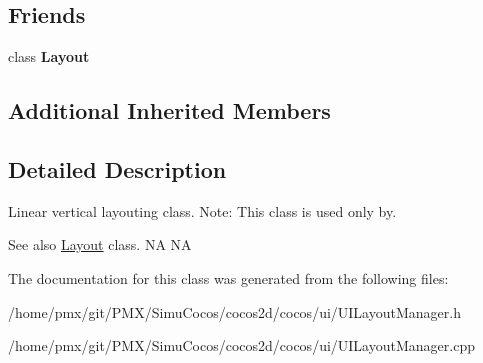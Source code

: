 \subsection*{Friends}
\begin{DoxyCompactItemize}
\item 
\mbox{\label{classui_1_1LinearVerticalLayoutManager_a1b7da28ed84c0763e8f92cde2df4799b}} 
class {\bfseries Layout}
\end{DoxyCompactItemize}
\subsection*{Additional Inherited Members}


\subsection{Detailed Description}
Linear vertical layouting class. Note\+: This class is used only by. 

\begin{DoxySeeAlso}{See also}
{\ttfamily \hyperlink{classui_1_1Layout}{Layout}} class.  NA  NA 
\end{DoxySeeAlso}


The documentation for this class was generated from the following files\+:\begin{DoxyCompactItemize}
\item 
/home/pmx/git/\+P\+M\+X/\+Simu\+Cocos/cocos2d/cocos/ui/U\+I\+Layout\+Manager.\+h\item 
/home/pmx/git/\+P\+M\+X/\+Simu\+Cocos/cocos2d/cocos/ui/U\+I\+Layout\+Manager.\+cpp\end{DoxyCompactItemize}
